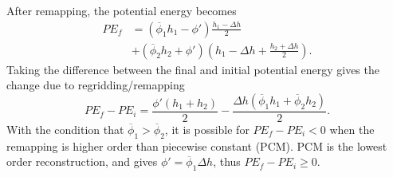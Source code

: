 After remapping, the potential energy becomes
%
\begin{equation}
  \begin{split}
    PE_f &= \left(\overline\phi_1 h_1 - \phi'\right)\frac{h_1 - \Delta h}{2} \\
    &+ \left(\overline\phi_2 h_2 + \phi'\right)\left(h_1 - \Delta h + \frac{h_2 + \Delta h}{2}\right).
  \end{split}
\end{equation}
%
Taking the difference between the final and initial potential energy gives the change due to regridding/remapping
%
\begin{equation}
  PE_f - PE_i = \frac{\phi'\left(h_1 + h_2\right)}{2} - \frac{\Delta h\left(\overline\phi_1 h_1 + \overline\phi_2 h_2\right)}{2}.
\end{equation}
%
With the condition that $\overline\phi_1 > \overline\phi_2$, it is possible for $PE_f - PE_i < 0$ when the remapping is higher order than piecewise constant (PCM). PCM is the lowest order reconstruction, and gives $\phi' = \overline\phi_1 \Delta h$, thus $PE_f - PE_i \ge 0$.
